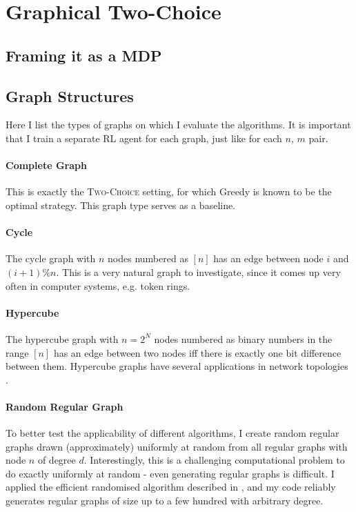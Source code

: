\section{Graphical Two-Choice}


\subsection{Framing it as a MDP}




\subsection{Graph Structures}


Here I list the types of graphs on which I evaluate the algorithms. It is important that I train a separate RL agent for each graph, just like for each $n$, $m$ pair.


\paragraph{Complete Graph} This is exactly the \textsc{Two-Choice} setting, for which Greedy is known to be the optimal strategy. This graph type serves as a baseline.


\paragraph{Cycle} The cycle graph with $n$ nodes numbered as $[n]$ has an edge between node $i$ and $(i+1)\%n$. This is a very natural graph to investigate, since it comes up very often in computer systems, e.g. token rings.


\paragraph{Hypercube} The hypercube graph with $n=2^N$ nodes numbered as binary numbers in the range $[n]$ has an edge between two nodes iff there is exactly one bit difference between them. Hypercube graphs have several applications in network topologies \cite{ostrouchov1987hypercubenetwork} .


\paragraph{Random Regular Graph} To better test the applicability of different algorithms, I create random regular graphs drawn (approximately) uniformly at random from all regular graphs with node $n$ of degree $d$. Interestingly, this is a challenging computational problem to do exactly uniformly at random - even generating regular graphs is difficult. I applied the efficient randomised algorithm described in \cite{steger1999randomregulargraphs}, and my code reliably generates regular graphs of size up to a few hundred with arbitrary degree.


